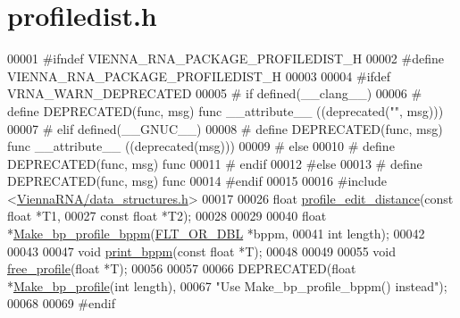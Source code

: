 \hypertarget{profiledist_8h_source}{}\section{profiledist.\+h}
\label{profiledist_8h_source}

\begin{DoxyCode}
00001 \textcolor{preprocessor}{#ifndef VIENNA\_RNA\_PACKAGE\_PROFILEDIST\_H}
00002 \textcolor{preprocessor}{#define VIENNA\_RNA\_PACKAGE\_PROFILEDIST\_H}
00003 
00004 \textcolor{preprocessor}{#ifdef VRNA\_WARN\_DEPRECATED}
00005 \textcolor{preprocessor}{# if defined(\_\_clang\_\_)}
00006 \textcolor{preprocessor}{#  define DEPRECATED(func, msg) func \_\_attribute\_\_ ((deprecated("", msg)))}
00007 \textcolor{preprocessor}{# elif defined(\_\_GNUC\_\_)}
00008 \textcolor{preprocessor}{#  define DEPRECATED(func, msg) func \_\_attribute\_\_ ((deprecated(msg)))}
00009 \textcolor{preprocessor}{# else}
00010 \textcolor{preprocessor}{#  define DEPRECATED(func, msg) func}
00011 \textcolor{preprocessor}{# endif}
00012 \textcolor{preprocessor}{#else}
00013 \textcolor{preprocessor}{# define DEPRECATED(func, msg) func}
00014 \textcolor{preprocessor}{#endif}
00015 
00016 \textcolor{preprocessor}{#include <\hyperlink{data__structures_8h}{ViennaRNA/data\_structures.h}>}
00017 
00026 \textcolor{keywordtype}{float} \hyperlink{profiledist_8h_abe75e90e00a1e5dd8862944ed53dad5d}{profile\_edit\_distance}(\textcolor{keyword}{const} \textcolor{keywordtype}{float} *T1,
00027                             \textcolor{keyword}{const} \textcolor{keywordtype}{float} *T2);
00028 
00029 
00040 \textcolor{keywordtype}{float} *\hyperlink{profiledist_8h_a3dff26e707a2a2e65a0f759caabde6e7}{Make\_bp\_profile\_bppm}(\hyperlink{group__data__structures_ga31125aeace516926bf7f251f759b6126}{FLT\_OR\_DBL}  *bppm,
00041                             \textcolor{keywordtype}{int}         length);
00042 
00043 
00047 \textcolor{keywordtype}{void}  \hyperlink{profiledist_8h_a8e0b4fe3698b3502945116ecc0ba6160}{print\_bppm}(\textcolor{keyword}{const} \textcolor{keywordtype}{float} *T);
00048 
00049 
00055 \textcolor{keywordtype}{void}  \hyperlink{profiledist_8h_a9b0b84a5a45761bf42d7c835dcdb3b85}{free\_profile}(\textcolor{keywordtype}{float} *T);
00056 
00057 
00066 DEPRECATED(\textcolor{keywordtype}{float} *\hyperlink{profiledist_8h_a904c7eaf4a2413567c00ac4891749d18}{Make\_bp\_profile}(\textcolor{keywordtype}{int} length),
00067 \textcolor{stringliteral}{"Use Make\_bp\_profile\_bppm() instead"});
00068 
00069 \textcolor{preprocessor}{#endif}
\end{DoxyCode}
